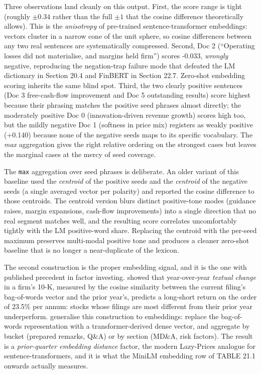 Three observations land cleanly on this output. First, the score range is tight (roughly $\pm 0.34$ rather than the full $\pm 1$ that the cosine difference theoretically allows). This is the \textit{anisotropy} of pre-trained sentence-transformer embeddings: vectors cluster in a narrow cone of the unit sphere, so cosine differences between any two real sentences are systematically compressed. Second, Doc 2 (``Operating losses did not materialise, and margins held firm'') scores -0.033, \textit{wrongly} negative, reproducing the negation-trap failure mode that defeated the LM dictionary in Section 20.4 and FinBERT in Section 22.7. Zero-shot embedding scoring inherits the same blind spot. Third, the two clearly positive sentences (Doc 3 free-cash-flow improvement and Doc 5 outstanding results) score highest because their phrasing matches the positive seed phrases almost directly; the moderately positive Doc 0 (innovation-driven revenue growth) scores high too, but the mildly negative Doc 1 (softness in price mix) registers as weakly positive (+0.140) because none of the negative seeds maps to its specific vocabulary. The \textit{max} aggregation gives the right relative ordering on the strongest cases but leaves the marginal cases at the mercy of seed coverage.

The \texttt{max} aggregation over seed phrases is deliberate. An older variant of this baseline used the \textit{centroid} of the positive seeds and the \textit{centroid} of the negative seeds (a single averaged vector per polarity) and reported the cosine difference to those centroids. The centroid version blurs distinct positive-tone modes (guidance raises, margin expansions, cash-flow improvements) into a single direction that no real segment matches well, and the resulting score correlates uncomfortably tightly with the LM positive-word share. Replacing the centroid with the per-seed maximum preserves multi-modal positive tone and produces a cleaner zero-shot baseline that is no longer a near-duplicate of the lexicon.

The second construction is the proper embedding signal, and it is the one with published precedent in factor investing. \cite{cohen2020lazy} showed that year-over-year \textit{textual change} in a firm's 10-K, measured by the cosine similarity between the current filing's bag-of-words vector and the prior year's, predicts a long-short return on the order of 23.5\% per annum: stocks whose filings are most different from their prior year underperform. \cite{cong2019textual} generalise this construction to embeddings: replace the bag-of-words representation with a transformer-derived dense vector, and aggregate by bucket (prepared remarks, Q\&A) or by section (MD\&A, risk factors). The result is a \textit{prior-quarter embedding distance} factor, the modern Lazy-Prices analogue for sentence-transformers, and it is what the MiniLM embedding row of TABLE 21.1 onwards actually measures.

